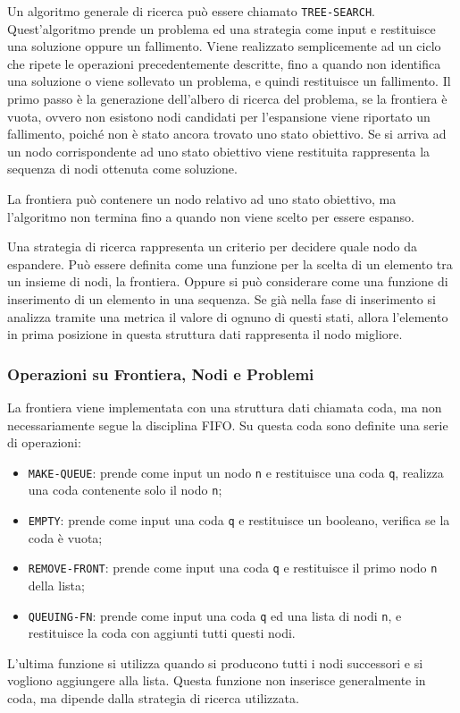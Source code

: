 \documentclass{article}
\numberwithin{equation}{subsection}
\begin{document}
Un algoritmo generale di ricerca può essere chiamato \color{red}\verb|TREE-SEARCH|\color{black}. Quest'algoritmo 
prende un problema ed una strategia come input e restituisce una soluzione oppure un fallimento. 
Viene realizzato semplicemente ad un ciclo che ripete le operazioni precedentemente descritte, 
fino a quando non identifica una soluzione o viene sollevato un problema, e quindi restituisce 
un fallimento. Il primo passo è la generazione dell'albero di ricerca del problema, se la frontiera è 
vuota, ovvero non esistono nodi candidati per l'espansione viene riportato un fallimento, poiché 
non è stato ancora trovato uno stato obiettivo. Se si arriva ad un nodo corrispondente ad uno 
stato obiettivo viene restituita rappresenta la sequenza di nodi ottenuta come soluzione. 

La frontiera può contenere un nodo relativo ad uno stato obiettivo, ma l'algoritmo non 
termina fino a quando non viene scelto per essere espanso. 


Una strategia di ricerca rappresenta un criterio per decidere quale nodo da espandere. 
Può essere definita come una funzione per la scelta di un elemento tra un insieme di nodi, la 
frontiera. Oppure si può considerare come una funzione di inserimento di un elemento in una 
sequenza. Se già nella fase di inserimento si analizza tramite una metrica il valore di ognuno 
di questi stati, allora l'elemento in prima posizione in questa struttura dati rappresenta il 
nodo migliore. 

\subsubsection{Operazioni su Frontiera, Nodi e Problemi}

La frontiera viene implementata con una struttura dati chiamata coda, ma non necessariamente 
segue la disciplina FIFO. Su questa coda sono definite una serie di operazioni:
\begin{itemize}
    \item \color{magenta}\verb|MAKE-QUEUE|\color{black}: prende come input un nodo \verb|n| e restituisce una coda \verb|q|, realizza una coda contenente solo il nodo \verb|n|;
    \item \color{magenta}\verb|EMPTY|\color{black}: prende come input una coda \verb|q| e restituisce un booleano, verifica se la coda è vuota;
    \item \color{magenta}\verb|REMOVE-FRONT|\color{black}: prende come input una coda \verb|q| e restituisce il primo nodo \verb|n| della lista; 
    \item \color{magenta}\verb|QUEUING-FN|\color{black}: prende come input una coda \verb|q| ed una lista di nodi \verb|n|, e restituisce la coda con aggiunti tutti questi nodi. 
\end{itemize}
L'ultima funzione si utilizza quando si producono tutti i nodi successori e si vogliono aggiungere 
alla lista. 
Questa funzione non inserisce generalmente in coda, ma dipende dalla strategia di ricerca 
utilizzata. 
\end{document}

